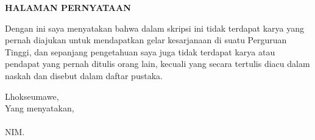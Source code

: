 \newpage
{}
\begin{center}
    \begin{doublespace}
        \textbf{\large HALAMAN PERNYATAAN}
    \end{doublespace}
\end{center}

\vspace{0.5cm}

\noindent Dengan ini saya menyatakan bahwa dalam skripsi ini tidak terdapat karya yang pernah diajukan untuk mendapatkan gelar kesarjanaan di suatu Perguruan Tinggi, dan sepanjang pengetahuan saya juga tidak terdapat karya atau pendapat yang pernah ditulis orang lain, kecuali yang secara tertulis diacu dalam naskah dan disebut dalam daftar pustaka.

\vspace{1.5cm}

\begin{flushright}
    Lhokseumawe, \tglpernyataan\\
    Yang menyatakan,\\[2cm]
    \textbf{\penulis} \\
    NIM. \nim\\[1cm]
\end{flushright}
